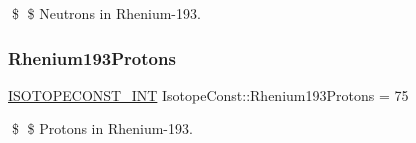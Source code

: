 \$ \$ Neutrons in Rhenium-\/193. \mbox{\label{group___isotope_const-_rhenium-_re193_gae6eafc7d39bbb5c5e027f91678c3f28b}} 
\subsubsection{\texorpdfstring{Rhenium193\+Protons}{Rhenium193Protons}}
{\footnotesize\ttfamily \mbox{\hyperlink{group___isotope_const-_macros_ga5f18360b3e99483a35c32d789e62621c}{I\+S\+O\+T\+O\+P\+E\+C\+O\+N\+S\+T\+\_\+\+I\+NT}} Isotope\+Const\+::\+Rhenium193\+Protons = 75}

\$ \$ Protons in Rhenium-\/193. 